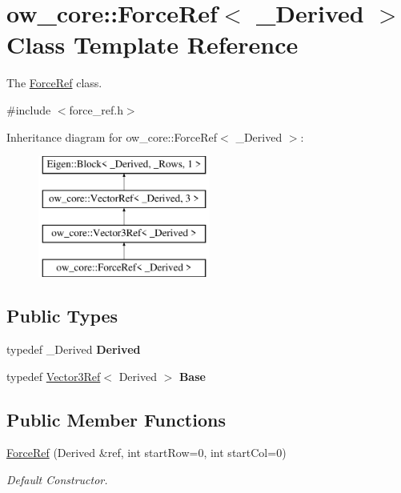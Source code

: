 \hypertarget{classow__core_1_1ForceRef}{}\section{ow\+\_\+core\+:\+:Force\+Ref$<$ \+\_\+\+Derived $>$ Class Template Reference}
\label{classow__core_1_1ForceRef}


The \hyperlink{classow__core_1_1ForceRef}{Force\+Ref} class.  




{\ttfamily \#include $<$force\+\_\+ref.\+h$>$}

Inheritance diagram for ow\+\_\+core\+:\+:Force\+Ref$<$ \+\_\+\+Derived $>$\+:\begin{figure}[H]
\begin{center}
\leavevmode
\includegraphics[height=4.000000cm]{d8/d3c/classow__core_1_1ForceRef}
\end{center}
\end{figure}
\subsection*{Public Types}
\begin{DoxyCompactItemize}
\item 
typedef \+\_\+\+Derived {\bfseries Derived}\hypertarget{classow__core_1_1ForceRef_a3f6e6ffbeb09f4aa9f9bb0708ea78413}{}\label{classow__core_1_1ForceRef_a3f6e6ffbeb09f4aa9f9bb0708ea78413}

\item 
typedef \hyperlink{classow__core_1_1Vector3Ref}{Vector3\+Ref}$<$ Derived $>$ {\bfseries Base}\hypertarget{classow__core_1_1ForceRef_a652bcc66be4d4ff071c4a6468b9da76c}{}\label{classow__core_1_1ForceRef_a652bcc66be4d4ff071c4a6468b9da76c}

\end{DoxyCompactItemize}
\subsection*{Public Member Functions}
\begin{DoxyCompactItemize}
\item 
\hyperlink{classow__core_1_1ForceRef_a30cace6ce8c34e20064bb2db164105f3}{Force\+Ref} (Derived \&ref, int start\+Row=0, int start\+Col=0)
\begin{DoxyCompactList}\small\item\em Default Constructor. \end{DoxyCompactList}\end{DoxyCompactItemize}


